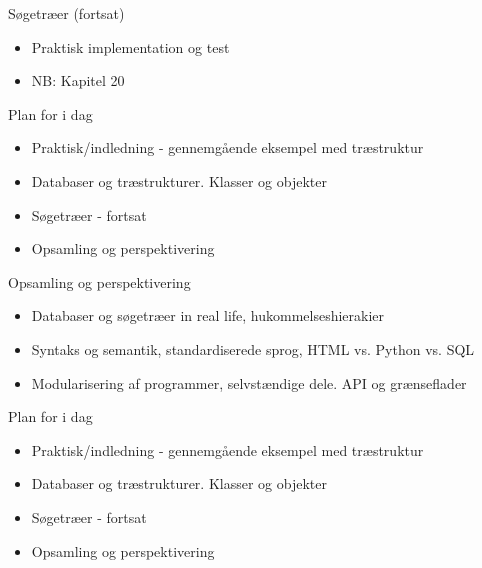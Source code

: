\documentclass[a4paper,landscape]{slides}
\begin{document}
\begin{slide}
	\begin{center} {\large 
            Søgetræer (fortsat) 
	} \end{center}
	\begin{itemize} \addtolength{\itemsep}{-\baselineskip}
            \item Praktisk implementation og test 
            \item NB: Kapitel 20
	\end{itemize}
\end{slide}

\begin{slide}
	\begin{center} {\large 
            Plan for i dag
	} \end{center}
	\begin{itemize} \addtolength{\itemsep}{-\baselineskip}
            \item Praktisk/indledning - gennemgående eksempel med træstruktur
            \item Databaser og træstrukturer. Klasser og objekter
            \item Søgetræer - fortsat
            \item Opsamling og perspektivering
	\end{itemize}
\end{slide}

\begin{slide}
	\begin{center} {\large 
            Opsamling og perspektivering 
	} \end{center}
	\begin{itemize} \addtolength{\itemsep}{-\baselineskip}
            \item Databaser og søgetræer in real life, hukommelseshierakier 
            \item Syntaks og semantik, standardiserede sprog, HTML vs. Python vs. SQL 
            \item Modularisering af programmer, selvstændige dele. API og grænseflader
	\end{itemize}
\end{slide}

\begin{slide}
	\begin{center} {\large 
            Plan for i dag
	} \end{center}
	\begin{itemize} \addtolength{\itemsep}{-\baselineskip}
            \item Praktisk/indledning - gennemgående eksempel med træstruktur
            \item Databaser og træstrukturer. Klasser og objekter
            \item Søgetræer - fortsat
            \item Opsamling og perspektivering
	\end{itemize}
\end{slide}
\end{document}
